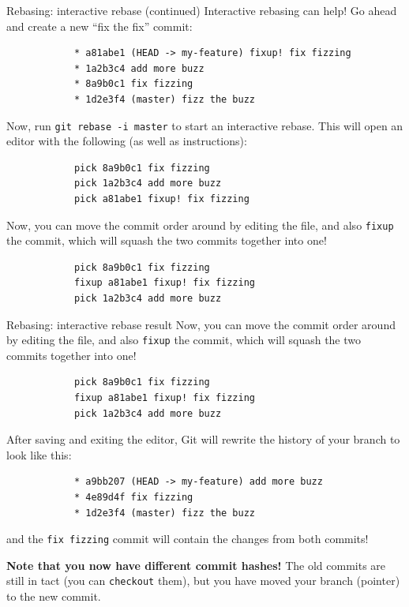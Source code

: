 \documentclass{beeper}
\begin{document}
\begin{frame}[fragile]{Rebasing: interactive rebase (continued)}
    Interactive rebasing can help! Go ahead and create a new ``fix the fix''
    commit:
    {
        \tiny
        \begin{verbatim}
            * a81abe1 (HEAD -> my-feature) fixup! fix fizzing
            * 1a2b3c4 add more buzz
            * 8a9b0c1 fix fizzing
            * 1d2e3f4 (master) fizz the buzz
        \end{verbatim}
    }

    Now, run \texttt{git rebase -i master} to start an interactive rebase. This
    will open an editor with the following (as well as instructions):
    {
        \tiny
        \begin{verbatim}
            pick 8a9b0c1 fix fizzing
            pick 1a2b3c4 add more buzz
            pick a81abe1 fixup! fix fizzing
        \end{verbatim}
    }
    \pause

    Now, you can move the commit order around by editing the file, and also
    \texttt{fixup} the commit, which will squash the two commits together into
    one!
    {
        \tiny
        \begin{verbatim}
            pick 8a9b0c1 fix fizzing
            fixup a81abe1 fixup! fix fizzing
            pick 1a2b3c4 add more buzz
        \end{verbatim}
    }
\end{frame}

\begin{frame}[fragile]{Rebasing: interactive rebase result}
    Now, you can move the commit order around by editing the file, and also
    \texttt{fixup} the commit, which will squash the two commits together into
    one!
    {
        \tiny
        \begin{verbatim}
            pick 8a9b0c1 fix fizzing
            fixup a81abe1 fixup! fix fizzing
            pick 1a2b3c4 add more buzz
        \end{verbatim}
    }
    \pause

    After saving and exiting the editor, Git will rewrite the history of your
    branch to look like this:
    {
        \tiny
        \begin{verbatim}
            * a9bb207 (HEAD -> my-feature) add more buzz
            * 4e89d4f fix fizzing
            * 1d2e3f4 (master) fizz the buzz
        \end{verbatim}
    }
    and the \texttt{fix fizzing} commit will contain the changes from both
    commits!
    \pause

    \textbf{Note that you now have different commit hashes!} The old commits are
    still in tact (you can \texttt{checkout} them), but you have moved your
    branch (pointer) to the new commit.
\end{frame}
\end{document}
